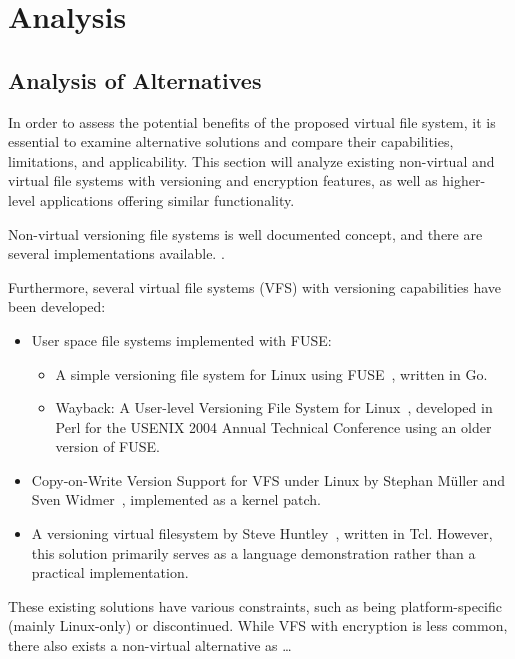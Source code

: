 \chapter{Analysis}
\label{chap:analysis}


\section{Analysis of Alternatives}\label{sec:alternatives}

In order to assess the potential benefits of the proposed virtual file system, it is essential to examine alternative solutions and compare their capabilities, limitations, and applicability.
This section will analyze existing non-virtual and virtual file systems with versioning and encryption features, as well as higher-level applications offering similar functionality.

Non-virtual versioning file systems is well documented concept, and there are several implementations available.
.

Furthermore, several virtual file systems (VFS) with versioning capabilities have been developed:

\begin{itemize}
    \item User space file systems implemented with FUSE:
    \begin{itemize}
        \item A simple versioning file system for Linux using FUSE~\cite{simple_vfs}, written in Go.
        \item Wayback: A User-level Versioning File System for Linux~\cite{wayback_vfs}, developed in Perl for the USENIX 2004 Annual Technical Conference using an older version of FUSE.
    \end{itemize}
    \item Copy-on-Write Version Support for VFS under Linux by Stephan Müller and Sven Widmer~\cite{vvfs}, implemented as a kernel patch.
    \item A versioning virtual filesystem by Steve Huntley~\cite{huntley_vvfs}, written in Tcl.
    However, this solution primarily serves as a language demonstration rather than a practical implementation.
\end{itemize}

These existing solutions have various constraints, such as being platform-specific (mainly Linux-only) or discontinued.
While VFS with encryption is less common, there also exists a non-virtual alternative as  \ldots %

